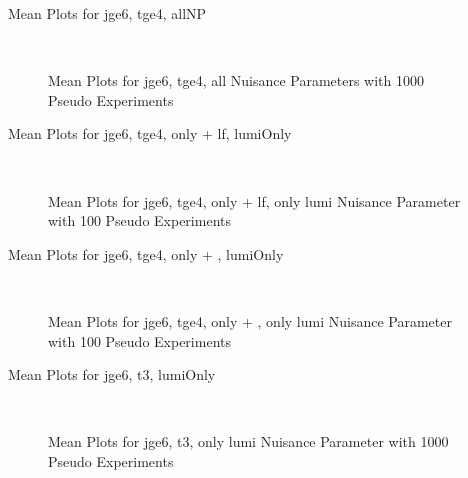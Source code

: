 \begin{frame}{Mean Plots for jge6, tge4, allNP}

\begin{figure}
\centering
{} $\qquad$
\scriptsize\caption[jge6$\_$tge4$\_$N1000$\_$allNP]{Mean Plots for jge6, tge4, all Nuisance Parameters with 1000 Pseudo Experiments}
\end{figure}

\end{frame}

\begin{frame}{Mean Plots for jge6, tge4, only \ttbarH\bbbar + \ttbar lf, lumiOnly}

\begin{figure}
\centering
{} $\qquad$
\scriptsize\caption[jge6$\_$tge4$\_$ttHbb$\_$ttlf$\_$lumiOnly]{Mean Plots for jge6, tge4, only \ttbarH\bbbar + \ttbar lf, only lumi Nuisance Parameter with 100 Pseudo Experiments}
\end{figure}

\end{frame}

\begin{frame}{Mean Plots for jge6, tge4, only \ttbarH\bbbar + \ttbar \bbbar, lumiOnly}

\begin{figure}
\centering
{} $\qquad$
\scriptsize\caption[jge6$\_$tge4$\_$ttHbb$\_$ttbb$\_$lumiOnly]{Mean Plots for jge6, tge4, only \ttbarH\bbbar + \ttbar \bbbar, only lumi Nuisance Parameter with 100 Pseudo Experiments}
\end{figure}

\end{frame}

\begin{frame}{Mean Plots for jge6, t3, lumiOnly}

\begin{figure}
\centering
{} $\qquad$
\scriptsize\caption[jge6$\_$t3$\_$lumiOnly]{Mean Plots for jge6, t3, only lumi Nuisance Parameter with 1000 Pseudo Experiments}
\end{figure}

\end{frame}

